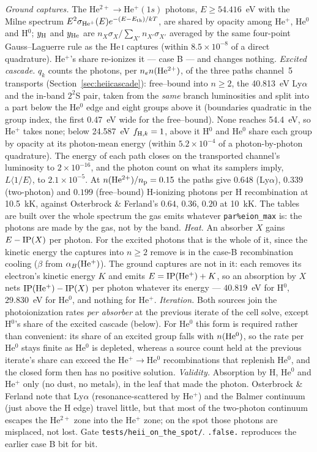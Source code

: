 \documentclass[english,a4paper]{my_memo}
\newcommand{\code}[1]{\texttt{#1}}
\begin{document}
\emph{Ground captures.}  The He$^{2+}\rightarrow$He$^+(1s)$ photons,
$E\ge54.416$~eV with the Milne spectrum
$E^2\sigma_{\rm He^+}(E)e^{-(E-E_{\rm th})/kT}$, are shared by opacity among
He$^+$, He$^0$ and H$^0$; $y_{\rm H}$ and $y_{\rm He}$ are
$n_X\sigma_X/\sum_{X'} n_{X'}\sigma_{X'}$ averaged by the same four-point
Gauss--Laguerre rule as the He\,\textsc{i} captures (within $8.5\times10^{-8}$
of a direct quadrature).  He$^+$'s share re-ionizes it --- case B --- and
changes nothing.
\emph{Excited cascade.}  $q_k$ counts the photons, per $n_e n({\rm He^{2+}})$,
of the three paths channel~5 transports (Section~\ref{sec:heiicascade}):
free--bound into $n\ge2$, the 40.813~eV Ly$\alpha$ and the in-band
$2^2$S pair, taken from the \emph{same} branch luminosities and split into
a part below the He$^0$ edge and eight groups above it (boundaries
quadratic in the group index, the first 0.47~eV wide for the free--bound).
None reaches 54.4~eV, so He$^+$ takes none; below 24.587~eV
$f_{{\rm H},k}=1$, above it H$^0$ and He$^0$ share each group by opacity at
its photon-mean energy (within $5.2\times10^{-4}$ of a photon-by-photon
quadrature).  The energy of each path closes on the transported channel's
luminosity to $2\times10^{-16}$, and the photon count on what its samplers
imply, $L\langle1/E\rangle$, to $2.1\times10^{-5}$.  At
$n({\rm He^{2+}})/n_{\rm p}=0.15$ the paths give $0.648$ (Ly$\alpha$),
$0.339$ (two-photon) and $0.199$ (free--bound) H-ionizing photons per H
recombination at 10.5~kK, against Osterbrock \& Ferland's $0.64$, $0.36$,
$0.20$ at 10~kK.  The tables are built over the whole spectrum the gas
emits whatever \code{par\%eion\_max} is: the photons are made by the gas,
not by the band.
\emph{Heat.}  An absorber $X$ gains $E-{\rm IP}(X)$ per photon.  For the
excited photons that is the whole of it, since the kinetic energy the
captures into $n\ge2$ remove is in the case-B recombination cooling
($\beta$ from $\alpha_B({\rm He^+})$).  The ground captures are not in it:
each removes its electron's kinetic energy $K$ and emits
$E={\rm IP(He^+)}+K$, so an absorption by $X$ nets
${\rm IP(He^+)}-{\rm IP}(X)$ per photon whatever its energy --- $40.819$~eV
for H$^0$, $29.830$~eV for He$^0$, and nothing for He$^+$.
\emph{Iteration.}  Both sources join the photoionization rates \emph{per
absorber} at the previous iterate of the cell solve, except H$^0$'s share of
the excited cascade (below).  For He$^0$ this form
is required rather than convenient: its share of an excited group falls
with $n({\rm He^0})$, so the rate per He$^0$ stays finite as He$^0$ is
depleted, whereas a source count held at the previous iterate's share can
exceed the He$^+\rightarrow$He$^0$ recombinations that replenish He$^0$, and
the closed form then has no positive solution.
\emph{Validity.}  Absorption by H, He$^0$ and He$^+$ only (no dust, no
metals), in the leaf that made the photon.  Osterbrock \& Ferland note that
Ly$\alpha$ (resonance-scattered by He$^+$) and the Balmer continuum (just
above the H edge) travel little, but that most of the two-photon continuum
escapes the He$^{2+}$ zone into the He$^+$ zone; on the spot those photons
are misplaced, not lost.  Gate \code{tests/heii\_on\_the\_spot/}.
\code{.false.} reproduces the earlier case B bit for bit.
\end{document}
